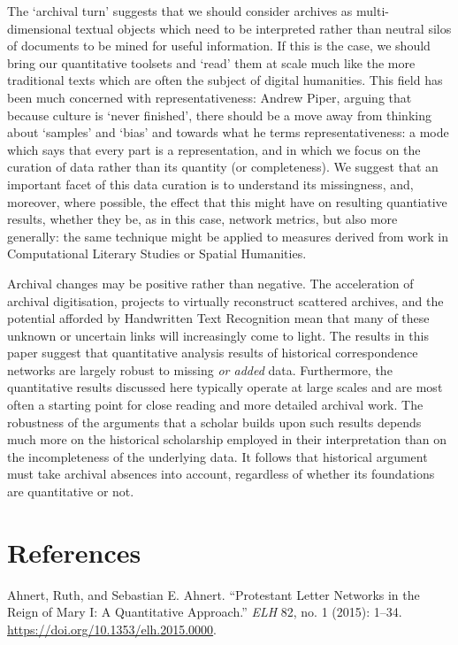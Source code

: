 \documentclass[]{article}
\begin{document}
The `archival turn' suggests that we should consider archives as multi-dimensional textual objects which need to be interpreted rather than neutral silos of documents to be mined for useful information. If this is the case, we should bring our quantitative toolsets and `read' them at scale much like the more traditional texts which are often the subject of digital humanities. This field has been much concerned with representativeness: Andrew Piper, arguing that because culture is `never finished', there should be a move away from thinking about `samples' and `bias' and towards what he terms representativeness: a mode which says that every part is a representation, and in which we focus on the curation of data rather than its quantity (or completeness). We suggest that an important facet of this data curation is to understand its missingness, and, moreover, where possible, the effect that this might have on resulting quantiative results, whether they be, as in this case, network metrics, but also more generally: the same technique might be applied to measures derived from work in Computational Literary Studies or Spatial Humanities.

Archival changes may be positive rather than negative. The acceleration of archival digitisation, projects to virtually reconstruct scattered archives, and the potential afforded by Handwritten Text Recognition mean that many of these unknown or uncertain links will increasingly come to light. The results in this paper suggest that quantitative analysis results of historical correspondence networks are largely robust to missing \emph{or added} data. Furthermore, the quantitative results discussed here typically operate at large scales and are most often a starting point for close reading and more detailed archival work. The robustness of the arguments that a scholar builds upon such results depends much more on the historical scholarship employed in their interpretation than on the incompleteness of the underlying data. It follows that historical argument must take archival absences into account, regardless of whether its foundations are quantitative or not.

\hypertarget{references}{%
\section*{References}\label{references}}

\hypertarget{refs}{}
\leavevmode\hypertarget{ref-ahnert_protestant_2015}{}%
Ahnert, Ruth, and Sebastian E. Ahnert. ``Protestant Letter Networks in the Reign of Mary I: A Quantitative Approach.'' \emph{ELH} 82, no. 1 (2015): 1--34. \url{https://doi.org/10.1353/elh.2015.0000}.
\end{document}
